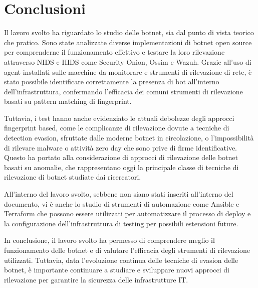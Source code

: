 \chapter{Conclusioni}





Il lavoro svolto ha riguardato lo studio delle botnet, sia dal punto di vista teorico che pratico. Sono state analizzate diverse implementazioni di botnet open source per comprenderne il funzionamento effettivo e testare la loro rilevazione attraverso NIDS e HIDS come Security Onion, Ossim e Wazuh. Grazie all'uso di agent installati sulle macchine da monitorare e strumenti di rilevazione di rete, è stato possibile identificare correttamente la presenza di bot all'interno dell'infrastruttura, confermando l'efficacia dei comuni strumenti di rilevazione basati su pattern matching di fingerprint.

Tuttavia, i test hanno anche evidenziato le attuali debolezze degli approcci fingerprint based, come le complicanze di rilevazione dovute a tecniche di detection evasion, sfruttate dalle moderne botnet in circolazione, o l'impossibilità di rilevare malware o attività zero day che sono prive di firme identificative.
 Questo ha portato alla considerazione di approcci di rilevazione delle botnet basati su anomalie, che rappresentano oggi la principale classe di tecniche di rilevazione di botnet studiate dai ricercatori.

All'interno del lavoro svolto, sebbene non siano stati inseriti all'interno del documento, vi è anche lo studio di strumenti di automazione come Ansible \cite{ansible} e Terraform \cite{terraform} che possono essere utilizzati per automatizzare il processo di deploy  e la configurazione dell'infrastruttura di testing per possibili estensioni future.

In conclusione, il lavoro svolto ha permesso di comprendere meglio il funzionamento delle botnet e di valutare l'efficacia degli strumenti di rilevazione utilizzati. Tuttavia, data l'evoluzione continua delle tecniche di evasion delle botnet, è importante continuare a studiare e sviluppare nuovi approcci di rilevazione per garantire la sicurezza delle infrastrutture IT.